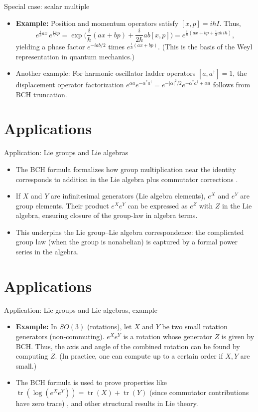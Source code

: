 \documentclass{beamer}
\begin{document}
\begin{frame}{Special case: scalar multiple}

  \begin{itemize}
\item \textbf{Example:} Position and momentum operators satisfy $[x, p] = i\hbar I$. Thus,
\[  
e^{\frac{i}{\hbar} a x}\,e^{\frac{i}{\hbar} b p} = \exp\!\Big(\frac{i}{\hbar}(a x + b p) + \frac{i}{2\hbar} a b [x,p]\Big) = e^{\frac{i}{\hbar}(a x + b p + \frac{1}{2}ab\,i\hbar)},
\]
yielding a phase factor $e^{-i ab/2}$ times $e^{\frac{i}{\hbar}(a x + b p)}$.  (This is the basis of the Weyl representation in quantum mechanics.)
\item Another example: For harmonic oscillator ladder operators $[a, a^\dagger]=1$, the displacement operator factorization $e^{\alpha a} e^{-\alpha^* a^\dagger} = e^{-|\alpha|^2/2} e^{-\alpha^* a^\dagger + \alpha a}$ follows from BCH truncation.
\end{itemize}
\end{frame}


\section{Applications}
\begin{frame}{Application: Lie groups and Lie algebras}
\begin{itemize}
\item The BCH formula formalizes how group multiplication near the identity corresponds to addition in the Lie algebra plus commutator corrections .
\item If $X$ and $Y$ are infinitesimal generators (Lie algebra elements), $e^X$ and $e^Y$ are group elements. Their product $e^X e^Y$ can be expressed as $e^Z$ with $Z$ in the Lie algebra, ensuring closure of the group-law in algebra terms.
\item This underpins the Lie group–Lie algebra correspondence: the complicated group law (when the group is nonabelian) is captured by a formal power series in the algebra.
\end{itemize}
\end{frame}


\section{Applications}
\begin{frame}{Application: Lie groups and Lie algebras, example}
\begin{itemize}
\item \textbf{Example:} In $SO(3)$ (rotations), let $X$ and $Y$ be two small rotation generators (non-commuting). $e^X e^Y$ is a rotation whose generator $Z$ is given by BCH. Thus, the axis and angle of the combined rotation can be found by computing $Z$. (In practice, one can compute up to a certain order if $X, Y$ are small.)
\item The BCH formula is used to prove properties like $\operatorname{tr}(\log(e^X e^Y)) = \operatorname{tr}(X) + \operatorname{tr}(Y)$ (since commutator contributions have zero trace) , and other structural results in Lie theory.
\end{itemize}
\end{frame}
\end{document}
